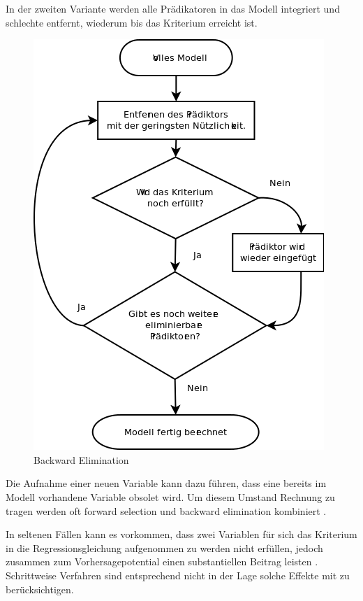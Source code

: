 \documentclass[english,12pt,doc]{apa}
\begin{document}
In der zweiten Variante werden alle Prädikatoren in das Modell integriert und schlechte entfernt, wiederum bis das Kriterium erreicht ist. 
\begin{figure}[hbtb]
	\centering
	\includegraphics[width=\textwidth]{backward_stepwise.png}
	\caption{Backward Elimination}
	\label{fig:backward_stepwise}
\end{figure}

Die Aufnahme einer neuen Variable kann dazu führen, dass eine bereits im Modell vorhandene Variable obsolet wird. 
Um diesem Umstand Rechnung zu tragen werden oft forward selection und backward elimination kombiniert \cite[p. 461]{bortz2011}. 

In seltenen Fällen kann es vorkommen, dass zwei Variablen für sich das Kriterium in die Regressionsgleichung aufgenommen zu werden nicht erfüllen, jedoch zusammen zum Vorhersagepotential einen substantiellen Beitrag leisten \cite[p.261]{jacob2003applied}. 
Schrittweise Verfahren sind entsprechend nicht in der Lage solche Effekte mit zu berücksichtigen. 
\end{document}
